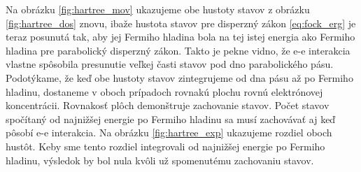 Na obrázku  \ref{fig:hartree_mov} ukazujeme obe hustoty stavov z obrázku \ref{fig:hartree_dos} znovu, ibaže hustota stavov pre disperzný zákon \eqref{eq:fock_erg} je teraz posunutá tak, 
aby jej Fermiho hladina bola na tej istej energia ako Fermiho hladina pre parabolický disperzný zákon. Takto je pekne vidno, že e-e interakcia vlastne spôsobila presunutie veľkej časti stavov
pod dno parabolického pásu. Podotýkame, že keď obe hustoty stavov zintegrujeme od dna pásu až po Fermiho hladinu, dostaneme v oboch prípadoch rovnakú plochu rovnú elektrónovej koncentrácii. Rovnakosť
plôch demonštruje zachovanie stavov. Počet stavov spočítaný od najnižšej energie po Fermiho hladinu sa musí zachovávať aj keď pôsobí e-e interakcia. Na obrázku  \ref{fig:hartree_exp} ukazujeme
rozdiel oboch hustôt. Keby sme tento rozdiel integrovali od najnižšej energie po Fermiho hladinu, výsledok by bol nula kvôli už spomenutému zachovaniu stavov.

